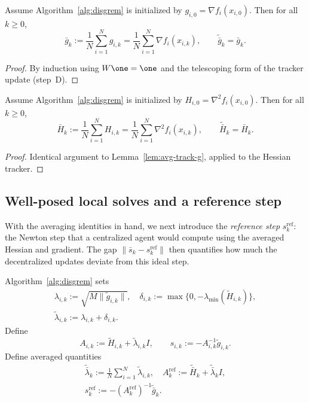 \documentclass[review,onefignum,onetabnum]{siamart171218}
\begin{document}
\begin{lemma}\label{lem:avg-track-g}
Assume Algorithm~\ref{alg:disgrem} is initialized by $g_{i,0}=\nabla f_i(x_{i,0})$.
Then for all $k\ge0$,
\[
\bar g_k:=\frac1N\sum_{i=1}^N g_{i,k}=\frac1N\sum_{i=1}^N\nabla f_i(x_{i,k}),
\qquad
\tilde{\bar g}_k=\bar g_k.
\]
\end{lemma}
\begin{proof}
By induction using $W\one=\one$ and the telescoping form of the tracker update (step~D).
\end{proof}

\begin{lemma}\label{lem:avg-track-h}
Assume Algorithm~\ref{alg:disgrem} is initialized by $H_{i,0}=\nabla^2 f_i(x_{i,0})$.
Then for all $k\ge0$,
\[
\bar H_k:=\frac1N\sum_{i=1}^N H_{i,k}=\frac1N\sum_{i=1}^N\nabla^2 f_i(x_{i,k}),
\qquad
\tilde{\bar H}_k=\bar H_k.
\]
\end{lemma}
\begin{proof}
Identical argument to Lemma~\ref{lem:avg-track-g}, applied to the Hessian tracker.
\end{proof}

\subsection{Well-posed local solves and a reference step}\label{ssec:refstep}
With the averaging identities in hand, we next introduce the
\emph{reference step} $s_k^{\mathrm{ref}}$: the Newton step that a
centralized agent would compute using the averaged Hessian and gradient.
The gap $\|\bar s_k - s_k^{\mathrm{ref}}\|$ then quantifies how much the
decentralized updates deviate from this ideal step.

Algorithm~\ref{alg:disgrem} sets
\begin{gather*}
\lambda_{i,k}:=\sqrt{M\|\tilde g_{i,k}\|},\quad
\delta_{i,k}:=\max\{0,-\lambda_{\min}(\tilde H_{i,k})\},\\
\tilde\lambda_{i,k}:=\lambda_{i,k}+\delta_{i,k}.
\end{gather*}
Define
\[
A_{i,k}:=\tilde H_{i,k}+\tilde\lambda_{i,k}I,
\qquad
s_{i,k}:=-A_{i,k}^{-1}\tilde g_{i,k}.
\]
Define averaged quantities
\begin{gather*}
\tilde{\bar\lambda}_k:=\tfrac1N\textstyle\sum_{i=1}^N \tilde\lambda_{i,k},\quad
A_k^{\mathrm{ref}}:=\tilde{\bar H}_k+\tilde{\bar\lambda}_k I,\\
s_k^{\mathrm{ref}}:=-(A_k^{\mathrm{ref}})^{-1}\tilde{\bar g}_k.
\end{gather*}
\end{document}
